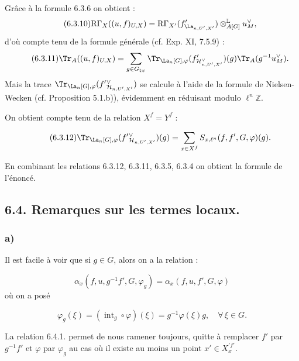 Grâce à la formule 6.3.6 on obtient :
\begin{equation}
\tag{6.3.10}
\mathrm{R}\Gamma_X((u,f)_{U,X})=\mathrm{R}\Gamma_{X'}(f'_{\La_{n,U',X'}})\otimes_{A[G]}^{\mathbb{L}}u_M^\vee,
\end{equation}
d'où compte tenu de la formule générale (cf. Exp. XI, 7.5.9) :
\begin{equation}
\tag{6.3.11}
\Tr_A((u,f)_{U,X})=
\sum_{g\in G_{\natural\varphi}}\Tr_{\La_n[G],\varphi}(f'_{\mathcal{H}^\vee_{n,U',X'}})(g)\Tr_A(g^{-1}u_M^\vee).
\end{equation}
Mais la trace $\Tr_{\La_n[G],\varphi}(f'{}^\vee_{\mathcal{H}_{n,U',X'}})$ se calcule à l'aide de la formule de Nielsen-Wecken (cf. Proposition 5.1.b)), évidemment en réduisant modulo $\ell^n\mathbb{Z}$.

On
obtient compte tenu de la relation $X^f=Y^f$ :

\begin{equation}\tag{6.3.12}
\Tr_{\La_n[G],\varphi}(f'{}^\vee_{\mathcal{H}_{n,U',X'}})(g)=\sum_{x\in X^f}S_{x,\ell^n}(f,f',G,\varphi)(g).
\end{equation}

En combinant les relations 6.3.12, 6.3.11, 6.3.5, 6.3.4 on obtient la formule de l'énoncé.

\subsection*{6.4. Remarques sur les termes locaux.}
\subsubsection*{a)} Il est facile à voir que si $g\in G$, alors on a la relation :

\begin{equation}\tag{6.4.1}
\alpha_x(f,u,g^{-1}f',G,\varphi_g)=\alpha_x(f,u,f',G,\varphi)
\end{equation}
où on a posé

\begin{equation}\tag{6.4.2}
\varphi_g(\xi)=(\operatorname{int}_g\circ\varphi)(\xi)=g^{-1}\varphi(\xi)g,
\quad \forall\,\xi\in G.
\end{equation}

La relation 6.4.1. permet de nous ramener toujours, quitte à remplacer $f'$ par $g^{-1}f'$ et $\varphi$ par $\varphi_g$ au cas où il existe au moins un point $x'\in X_x^{\prime f'}$.

